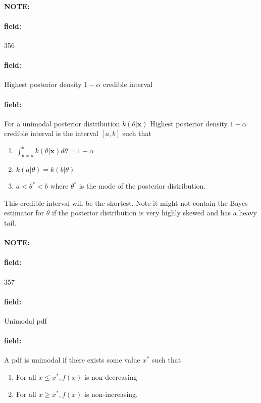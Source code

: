 \documentclass[12pt]{article}
\newenvironment{note}{\paragraph{NOTE:}}{}
\newenvironment{field}{\paragraph{field:}}{}
\begin{document}
\begin{note}
    \begin{field}
        \tiny 356
    \end{field}
    \begin{field}
        Highest posterior density $1 - \alpha$ credible interval
    \end{field}
    \begin{field}
        For a unimodal posterior distribution $k(\theta|\mathbf{x})$ Highest posterior density $1 - \alpha$ credible interval is the interval $[a,b]$ such that
        \begin{enumerate}
          \item $\int_{\theta = a}^b k(\theta|\mathbf{x})d\theta = 1 - \alpha$
          \item $k(a|\theta) = k(b|\theta)$
          \item $a < \theta^* < b$ where $\theta^*$ is the mode of the posterior distribution.
        \end{enumerate}
        This credible interval will be the shortest. Note it might not contain the Bayes estimator for $\theta$ if the posterior distribution is very highly skewed and has a heavy tail.
    \end{field}
\end{note}

\begin{note}
    \begin{field}
        \tiny 357
    \end{field}
    \begin{field}
        Unimodal pdf
    \end{field}
    \begin{field}
        A pdf is unimodal if there exists some value $x^*$ such that
        \begin{enumerate}
          \item For all $x \leq x^*, f(x)$ is non decreasing
          \item For all $x \geq x^*, f(x)$ is non-increasing.
        \end{enumerate}
    \end{field}
\end{note}
\end{document}
